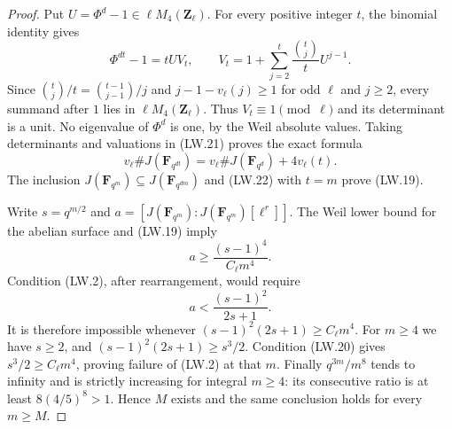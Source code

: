 \documentclass[11pt,a4paper]{article}
\begin{document}
\begin{proof}
Put $U=\Phi^d-1\in\ell M_4(\mathbf Z_\ell)$.
For every positive integer $t$, the binomial identity gives
\[
 \Phi^{dt}-1=tU V_t,\qquad
 V_t=1+\sum_{j=2}^t\frac{\binom tj}{t}U^{j-1}.
 \tag{LW.21}
\]
Since
$\binom tj/t=\binom{t-1}{j-1}/j$ and
$j-1-v_\ell(j)\ge1$ for odd $\ell$ and $j\ge2$,
every summand after $1$ lies in $\ell M_4(\mathbf Z_\ell)$.
Thus $V_t\equiv1\pmod\ell$ and its determinant is a unit.
No eigenvalue of $\Phi^d$ is one, by the Weil absolute values.
Taking determinants and valuations in (LW.21) proves the exact formula
\[
 v_\ell\#J(\mathbf F_{q^{dt}})
   =v_\ell\#J(\mathbf F_{q^d})+4v_\ell(t).
 \tag{LW.22}
\]
The inclusion
$J(\mathbf F_{q^m})\subseteq J(\mathbf F_{q^{dm}})$
and (LW.22) with $t=m$ prove (LW.19).

Write $s=q^{m/2}$ and
$a=[J(\mathbf F_{q^m}):J(\mathbf F_{q^m})[\ell^r]]$.
The Weil lower bound for the abelian surface and (LW.19) imply
\[
                     a\ge\frac{(s-1)^4}{C_\ell m^4}.
 \tag{LW.23}
\]
Condition (LW.2), after rearrangement, would require
\[
                        a<\frac{(s-1)^2}{2s+1}.
 \tag{LW.24}
\]
It is therefore impossible whenever
$(s-1)^2(2s+1)\ge C_\ell m^4$.
For $m\ge4$ we have $s\ge2$, and
$(s-1)^2(2s+1)\ge s^3/2$.
Condition (LW.20) gives $s^3/2\ge C_\ell m^4$,
proving failure of (LW.2) at that $m$.
Finally $q^{3m}/m^8$ tends to infinity and is strictly increasing
for integral $m\ge4$: its consecutive ratio is at least
$8(4/5)^8>1$.  Hence $M$ exists and the same conclusion holds
for every $m\ge M$.
\end{proof}
\end{document}
